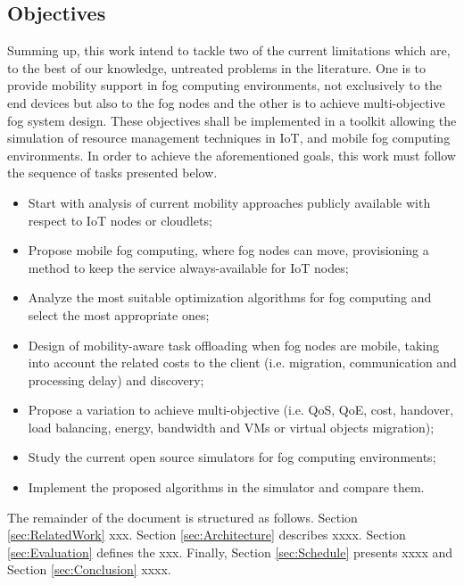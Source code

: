 
\subsection{Objectives}\label{subsec:Objectives}
\noindent\tab Summing up, this work intend to tackle two of the current
limitations which are, to the best of our knowledge, untreated problems in the
literature. One is to provide mobility support in fog computing environments,
not exclusively to the end devices but also to the fog nodes and the other is to
achieve multi-objective fog system design. These objectives shall be implemented
in a toolkit allowing the simulation of resource management techniques in IoT,
and mobile fog computing environments. In order to achieve the aforementioned
goals, this work must follow the sequence of tasks presented below.

\begin{itemize}
	\item Start with analysis of current mobility approaches publicly available
	with respect to IoT nodes or cloudlets;
	\item Propose mobile fog computing, where fog nodes can move, provisioning a
	method to keep the service always-available for IoT nodes;
	\item Analyze the most suitable optimization algorithms for fog computing
	and select the most appropriate ones;
	\item Design of mobility-aware task offloading when fog nodes are mobile,
	taking into account the related costs to the client (i.e. migration,
	communication and processing delay) and discovery;
	\item Propose a variation to achieve multi-objective (i.e. QoS, QoE, cost,
	handover, load balancing, energy, bandwidth and VMs or virtual objects
	migration);
	\item Study the current open source simulators for fog computing
	environments;
	\item Implement the proposed algorithms in the simulator and compare them.
\end{itemize}

\noindent\tab The remainder of the document is structured as follows. Section
\ref{sec:RelatedWork} xxx. Section \ref{sec:Architecture} describes xxxx.
Section \ref{sec:Evaluation} defines the xxx. Finally, Section
\ref{sec:Schedule} presents xxxx and Section \ref{sec:Conclusion} xxxx.